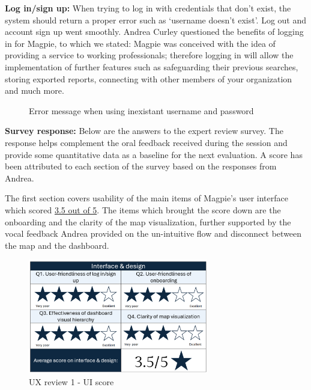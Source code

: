\textbf{Log in/sign up: }
When trying to log in with credentials that don't exist, the system should
return a proper error such as `username doesn't exist'. Log out and account sign
up went smoothly. Andrea Curley questioned the benefits of logging in for
Magpie, to which we stated: Magpie was conceived with the idea of providing a
service to working professionals; therefore logging in will allow the
implementation of further features such as safeguarding their previous searches,
storing exported reports, connecting with other members of your organization and
much more.
\begin{figure}[h!]
    \centering
    \caption{Error message when using inexistant username and password}
\end{figure}

\newpage{}

\textbf{Survey response: }
Below are the answers to the expert review survey. The response helps complement
the oral feedback received during the session and provide some quantitative data
as a baseline for the next evaluation. A score has been attributed to each
section of the survey based on the responses from Andrea.

The first section covers usability of the main items of Magpie's user interface
which scored \underline{3.5 out of 5}. The items which brought the score down
are the onboarding and the clarity of the map visualization, further supported
by the vocal feedback Andrea provided on the un-intuitive flow and disconnect
between the map and the dashboard.

\begin{figure}[h!]
    \centering
    \includegraphics[width=0.7\textwidth]{images/ux-survey1-ui.png}
    \caption{UX review 1 - UI score}
\end{figure}

